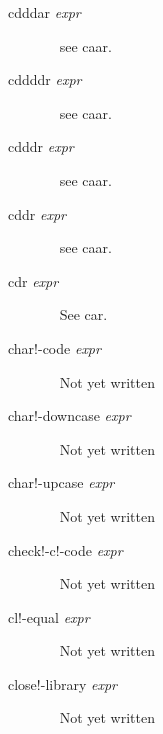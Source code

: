 \documentclass[a4paper,11pt]{article}
\begin{document}
\begin{description}
\item[{\ttfamily cdddar} {\itshape expr}]  ~\newline
see {\ttfamily caar}.

\item[{\ttfamily cddddr} {\itshape expr}]  ~\newline
see {\ttfamily caar}.

\item[{\ttfamily cdddr} {\itshape expr}]  ~\newline
see {\ttfamily caar}.

\item[{\ttfamily cddr} {\itshape expr}]  ~\newline
see {\ttfamily caar}.

\item [{\ttfamily cdr} {\itshape expr}]  ~\newline
See {\ttfamily car}.

\item [{\ttfamily char!-code} {\itshape  expr}]  ~\newline
Not yet written

\item [{\ttfamily char!-downcase} {\itshape  expr}]  ~\newline
Not yet written

\item [{\ttfamily char!-upcase} {\itshape  expr}]  ~\newline
Not yet written

\item [{\ttfamily check!-c!-code} {\itshape  expr}]  ~\newline
Not yet written

\item [{\ttfamily cl!-equal} {\itshape  expr}]  ~\newline
Not yet written

\item [{\ttfamily close!-library} {\itshape  expr}]  ~\newline
Not yet written


\end{description}
\end{document}
